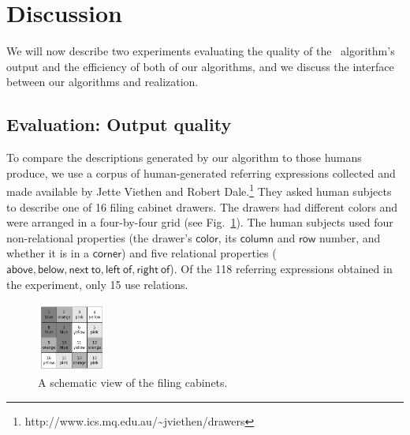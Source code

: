 \section{Discussion} \label{sec:discussion}

We will now describe two experiments evaluating the quality of the \el\
algorithm's output and the efficiency of both of our algorithms, and
we discuss the interface between our algorithms and realization.





\subsection{Evaluation: Output quality}

To compare the descriptions generated by our algorithm to those humans
produce, we use a corpus of human-generated referring expressions
collected and made available by Jette Viethen and Robert
Dale.\footnote{http://www.ics.mq.edu.au/\~{}jviethen/drawers} They
asked human subjects to describe one of 16 filing cabinet drawers. The
drawers had different colors and were arranged in a four-by-four grid
(see Fig.~\ref{fig:drawers}). The human subjects used four
non-relational properties (the drawer's $\mathsf{color}$, its
$\mathsf{column}$ and $\mathsf{row}$ number, and whether it is in a
$\mathsf{corner}$) and five relational properties ($\mathsf{above,
  below, next\ to, left\ of, right\ of}$). Of the 118 referring
expressions obtained in the experiment, only 15 use relations.

\begin{figure}
\begin{center}
\includegraphics[width=0.2\textwidth]{drawers.png}
\end{center}\vspace*{-3ex}
\caption{A schematic view of the filing cabinets.}\label{fig:drawers}\vspace*{-1.5ex}
\end{figure}


